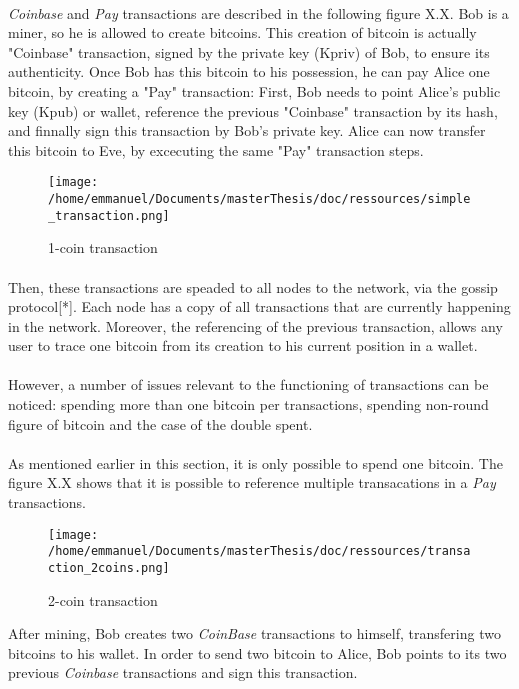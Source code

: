 \paragraph{}
\emph{Coinbase} and \emph{Pay} transactions are described in the following figure X.X. Bob is a miner, so he is allowed to create bitcoins. This creation of bitcoin is actually "Coinbase" transaction, signed by the private key (Kpriv) of Bob, to ensure its authenticity. Once Bob has this bitcoin to his possession, he can pay Alice one bitcoin, by creating a "Pay" transaction: First, Bob needs to point Alice's public key (Kpub) or wallet, reference the previous "Coinbase" transaction by its hash, and finnally sign this transaction by Bob's private key. Alice can now transfer this bitcoin to Eve, by excecuting the same "Pay" transaction steps. 
\begin{figure}[!h]
\centering
\texttt{[image: /home/emmanuel/Documents/masterThesis/doc/ressources/simple\_transaction.png]}
\caption{1-coin transaction}
\label{}
\end{figure}

\paragraph{}
Then, these transactions are speaded to all nodes to the network, via the gossip protocol[*]. Each node has a copy of all transactions that are currently happening in the network. Moreover, the referencing of the previous transaction, allows any user to trace one bitcoin from its creation to his current position in a wallet.
\paragraph{}
However, a number of issues relevant to the functioning of transactions can be noticed: spending more than one bitcoin per transactions, spending non-round figure of bitcoin and the case of the double spent.
\paragraph{}
As mentioned earlier in this section, it is only possible to spend one bitcoin. The figure X.X shows that it is possible to reference multiple transacations in a \emph{Pay} transactions.
\begin{figure}[htp]
\centering
\texttt{[image: /home/emmanuel/Documents/masterThesis/doc/ressources/transaction\_2coins.png]}
\caption{2-coin transaction}
\label{}
\end{figure} 
After mining, Bob creates two \emph{CoinBase} transactions to himself, transfering two bitcoins to his wallet. In order to send two bitcoin to Alice, Bob points to its two previous \emph{Coinbase} transactions and sign this transaction.
